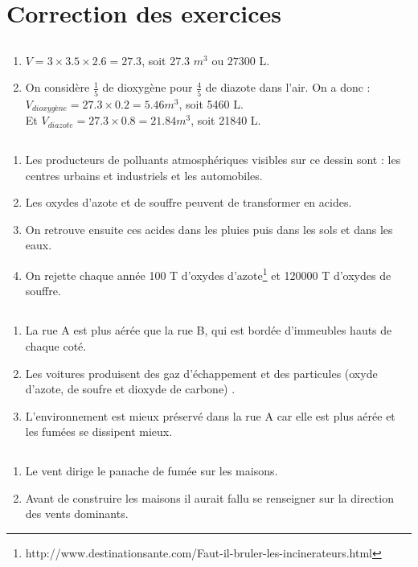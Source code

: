 \documentclass[12pt,a4paper]{article}
\begin{document}
\section*{Correction des exercices}

\subsection*{}

\begin{enumerate}[label=\alph*)]
	\item $V = 3 \times \num{3.5} \times \num{2.6} = \num{27.3}$, soit \num{27.3} $m^3$ ou $ \num{27300}$ L.
	\item On considère $\frac{1}{5}$ de dioxygène pour $\frac{4}{5}$ de diazote dans l'air.
	On a donc  :\\ $V_{dioxygène}=\num{27.3} \times \num{0.2} = \num{5.46} m^3$, soit \num{5460} L.\\
	Et $V_{diazote}=\num{27.3} \times \num{0.8} = \num{21.84} m^3$, soit \num{21840} L.
\end{enumerate}

\subsection*{}
\begin{enumerate}[label=\alph*)]
	\item Les producteurs de polluants atmosphériques visibles sur ce dessin sont : les centres urbains et industriels et les automobiles.
	\item Les oxydes d'azote et de souffre peuvent de transformer en acides.
	\item On retrouve ensuite ces acides dans les pluies puis dans les sols et dans les eaux.
	\item On rejette chaque année 100 T d'oxydes d'azote\footnote{http://www.destinationsante.com/Faut-il-bruler-les-incinerateurs.html} et \num{120 000} T d'oxydes de souffre. 
\end{enumerate}

\subsection*{}

\begin{enumerate}[label=\alph*)]
	\item La rue A est plus aérée que la rue B, qui est bordée d'immeubles hauts de chaque coté.
	\item Les voitures produisent des gaz d'échappement et des particules (oxyde d'azote, de soufre et dioxyde de carbone) .
	\item L'environnement est mieux préservé dans la rue A car elle est plus aérée et les fumées se dissipent mieux.
\end{enumerate}

\subsection*{}

\begin{enumerate}[label=\alph*)]
	\item Le vent dirige le panache de fumée sur les maisons.
	\item Avant de construire les maisons il aurait fallu se renseigner sur la direction des vents dominants.
\end{enumerate}
\end{document}

